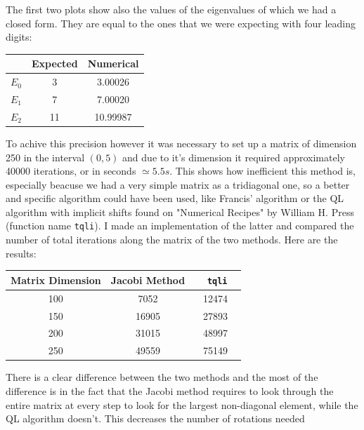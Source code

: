 \documentclass[10pt,a4paper,titlepage]{article}
\begin{document}
The first two plots show also the values of the eigenvalues of which we had a closed form. They are equal to the ones that we were expecting with four
leading digits:\\
\begin{center}
\begin{tabular}{|c|c|c|}
\hline
       &  Expected &  Numerical\\\hline
$E_0$  &         3 &  3.00026  \\\hline
$E_1$  &         7 &  7.00020  \\\hline
$E_2$  &        11 & 10.99987  \\\hline
\end{tabular}
\end{center}
To achive this precision however it was necessary to set up a matrix of dimension 250 in the interval $(0,5)$ and due to it's dimension it required 
approximately 40000 iterations, or in seconds $\simeq 5.5 s$. This shows how inefficient this method is, especially beacuse we had a very simple matrix
as a tridiagonal one, so a better and specific algorithm could have been used, like Francis' algorithm or the QL algorithm with implicit shifts found
on "Numerical Recipes" by William H. Press (function name \texttt{tqli}). I made an implementation of the latter and compared the number of total 
iterations along the matrix of the two methods. Here are the results:\\
\begin{center}
\begin{tabular}{|c|c|c|}
\hline
Matrix Dimension  &  Jacobi Method &  $~~~~$ \texttt{tqli}$~~~~$ \\\hline
100  &   7052  &  12474  \\\hline
150  &   16905 &  27893  \\\hline
200  &   31015 &  48997  \\\hline
250  &   49559 &  75149  \\\hline
\end{tabular}
\end{center}
There is a clear difference between the two methods and the most of the difference is in the fact that the Jacobi method requires to look through the 
entire matrix at every step to look for the largest non-diagonal element, while the QL algorithm doesn't. This decreases the number of rotations needed
\end{document}
